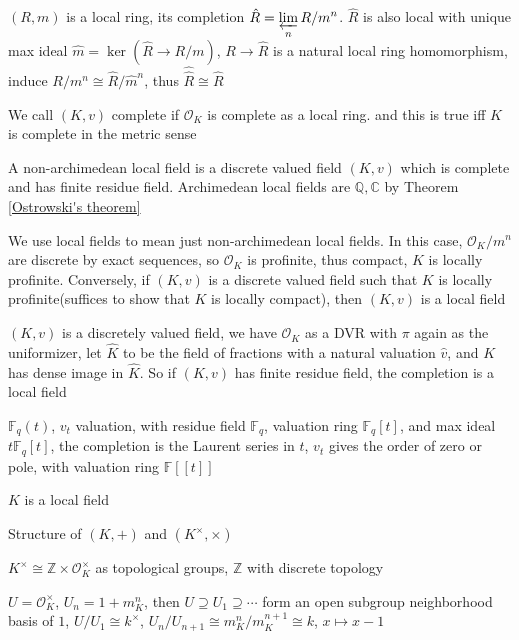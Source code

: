 \documentclass[main]{subfiles}
\begin{document}
\begin{definition}
$(R,m)$ is a local ring, its completion $\hat R=\displaystyle\varprojlim_{n}R/m^n$. $\hat R$ is also local with unique max ideal $\hat m=\ker(\hat R\to R/m)$, $R\to \hat R$ is a natural local ring homomorphism, induce $R/m^n\cong \hat R/\hat m^n$, thus $\hat{\hat R}\cong\hat R$
\end{definition}

We call $(K,v)$ complete if $\mathcal O_K$ is complete as a local ring. and this is true iff $K$ is complete in the metric sense

\begin{definition}
A non-archimedean local field is a discrete valued field $(K,v)$ which is complete and has finite residue field. Archimedean local fields are $\mathbb Q,\mathbb C$ by Theorem \ref{Ostrowski's theorem}
\end{definition}

We use local fields to mean just non-archimedean local fields. In this case, $\mathcal O_K/m^n$ are discrete by exact sequences, so $\mathcal O_K$ is profinite, thus compact, $K$ is locally profinite. Conversely, if $(K,v)$ is a discrete valued field such that $K$ is locally profinite(suffices to show that $K$ is locally compact), then $(K,v)$ is a local field

$(K,v)$ is a discretely valued field, we have $\hat{\mathcal O_K}$ as a DVR with $\pi$ again as the uniformizer, let $\hat K$ to be the field of fractions with a natural valuation $\hat v$, and $K$ has dense image in $\hat K$. So if $(K,v)$ has finite residue field, the completion is a local field

\begin{example}
$\mathbb F_q(t)$, $v_t$ valuation, with residue field $\mathbb F_q$, valuation ring $\mathbb F_q[t]$, and max ideal $t\mathbb F_q[t]$, the completion is the Laurent series in $t$, $v_t$ gives the order of zero or pole, with valuation ring $\mathbb F[[t]]$
\end{example}

$K$ is a local field

Structure of $(K,+)$ and $(K^\times,\times)$

$K^\times\cong\mathbb Z\times\mathcal O_K^\times$ as topological groups, $\mathbb Z$ with discrete topology

$U=\mathcal O_K^\times$, $U_n=1+m_K^n$, then $U\supseteq U_1\supseteq\cdots$ form an open subgroup neighborhood basis of $1$, $U/U_1\cong k^\times$, $U_n/U_{n+1}\cong m_K^n/m_K^{n+1}\cong k$, $x\mapsto x-1$
\end{document}
